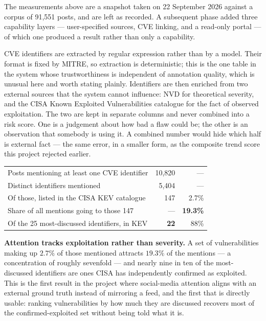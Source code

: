 \documentclass[11pt]{article}
\begin{document}
The measurements above are a snapshot taken on 22 September 2026 against a
corpus of 91{,}551 posts, and are left as recorded. A subsequent phase added
three capability layers --- user-specified sources, CVE linking, and a read-only
portal --- of which one produced a result rather than only a capability.

CVE identifiers are extracted by regular expression rather than by a model.
Their format is fixed by MITRE, so extraction is deterministic; this is the one
table in the system whose trustworthiness is independent of annotation quality,
which is unusual here and worth stating plainly. Identifiers are then enriched
from two external sources that the system cannot influence: NVD for theoretical
severity, and the CISA Known Exploited Vulnerabilities catalogue for the fact of
observed exploitation. The two are kept in separate columns and never combined
into a risk score. One is a judgement about how bad a flaw could be; the other
is an observation that somebody is using it. A combined number would hide which
half is external fact --- the same error, in a smaller form, as the composite
trend score this project rejected earlier.

\begin{center}
\begin{tabularx}{\linewidth}{@{}Lrr@{}}
\toprule
{} &  &  \\
\midrule
Posts mentioning at least one CVE identifier & 10{,}820 & --- \\
Distinct identifiers mentioned              & 5{,}404  & --- \\
Of those, listed in the CISA KEV catalogue  & 147      & 2.7\% \\
Share of all mentions going to those 147    & ---      & \textbf{19.3\%} \\
Of the 25 most-discussed identifiers, in KEV & \textbf{22} & 88\% \\
\bottomrule
\end{tabularx}
\end{center}

\begin{keybox}
\textbf{Attention tracks exploitation rather than severity.} A set of
vulnerabilities making up $2.7\%$ of those mentioned attracts $19.3\%$ of the
mentions --- a concentration of roughly sevenfold --- and nearly nine in ten of
the most-discussed identifiers are ones CISA has independently confirmed as
exploited. This is the first result in the project where social-media attention
aligns with an external ground truth instead of mirroring a feed, and the first
that is directly usable: ranking vulnerabilities by how much they are discussed
recovers most of the confirmed-exploited set without being told what it is.
\end{keybox}
\end{document}
